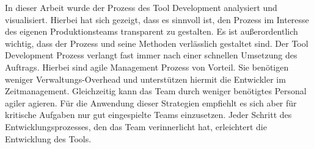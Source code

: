 \documentclass[pagesize, paper=a4, fontsize=12pt, titlepage=true, headings=small, headnosepline, abstractoff, liststotoc, nochapterprefix, plainheadsepline, twoside]{scrreprt}
\begin{document}
In dieser Arbeit wurde der Prozess des Tool Development analysiert und visualisiert. Hierbei hat sich gezeigt, dass es sinnvoll ist, den Prozess im Interesse des eigenen Produktionsteams transparent zu gestalten. Es ist außerordentlich wichtig, dass der Prozess und seine Methoden verlässlich gestaltet sind. Der Tool Development Prozess verlangt fast immer nach einer schnellen Umsetzung des Auftrags. Hierbei sind agile Management Prozess von Vorteil. Sie benötigen weniger Verwaltungs-Overhead und unterstützen hiermit die Entwickler im Zeitmanagement. Gleichzeitig kann das Team durch weniger benötigtes Personal agiler agieren. Für die Anwendung dieser Strategien empfiehlt es sich aber für kritische Aufgaben nur gut eingespielte Teams einzusetzen. Jeder Schritt des Entwicklungsprozesses, den das Team verinnerlicht hat, erleichtert die Entwicklung des Tools.\\
\end{document}
